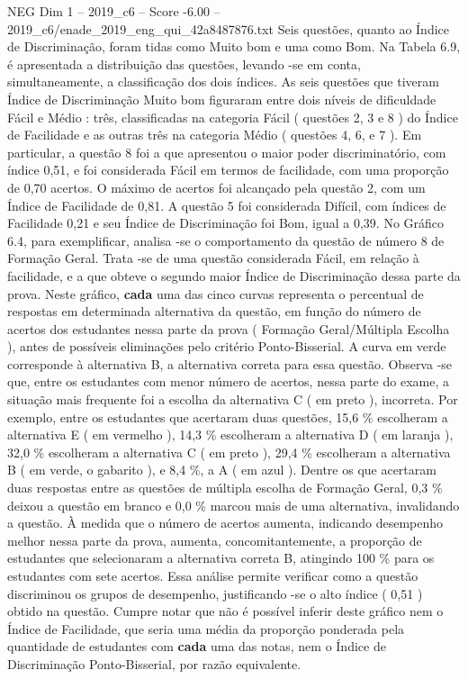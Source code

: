 \begin{textsample}{NEG Dim 1 – 2019\_c6 – Score -6.00 – 2019\_c6/enade\_2019\_eng\_qui\_42a8487876.txt}
Seis questões, quanto ao Índice de Discriminação, foram tidas como Muito bom e uma como Bom.
Na Tabela 6.9, é apresentada a distribuição das questões, levando -se em conta, simultaneamente, a classificação dos dois índices.
As seis questões que tiveram Índice de Discriminação Muito bom figuraram entre dois níveis de dificuldade Fácil e Médio : três, classificadas na categoria Fácil ( questões 2, 3 e 8 ) do Índice de Facilidade e as outras três na categoria Médio ( questões 4, 6, e 7 ).
Em particular, a questão 8 foi a que apresentou o maior poder discriminatório, com índice 0,51, e foi considerada Fácil em termos de facilidade, com uma proporção de 0,70 acertos.
O máximo de acertos foi alcançado pela questão 2, com um Índice de Facilidade de 0,81.
A questão 5 foi considerada Difícil, com índices de Facilidade 0,21 e seu Índice de Discriminação foi Bom, igual a 0,39.
No Gráfico 6.4, para exemplificar, analisa -se o comportamento da questão de número 8 de Formação Geral.
Trata -se de uma questão considerada Fácil, em relação à facilidade, e a que obteve o segundo maior Índice de Discriminação dessa parte da prova.
Neste gráfico, \textbf{cada} uma das cinco curvas representa o percentual de respostas em determinada alternativa da questão, em função do número de acertos dos estudantes nessa parte da prova ( Formação Geral/Múltipla Escolha ), antes de possíveis eliminações pelo critério Ponto-Bisserial.
A curva em verde corresponde à alternativa B, a alternativa correta para essa questão.
Observa -se que, entre os estudantes com menor número de acertos, nessa parte do exame, a situação mais frequente foi a escolha da alternativa C ( em preto ), incorreta.
Por exemplo, entre os estudantes que acertaram duas questões, 15,6 \% escolheram a alternativa E ( em vermelho ), 14,3 \% escolheram a alternativa D ( em laranja ), 32,0 \% escolheram a alternativa C ( em preto ), 29,4 \% escolheram a alternativa B ( em verde, o gabarito ), e 8,4 \%, a A ( em azul ).
Dentre os que acertaram duas respostas entre as questões de múltipla escolha de Formação Geral, 0,3 \% deixou a questão em branco e 0,0 \% marcou mais de uma alternativa, invalidando a questão.
À medida que o número de acertos aumenta, indicando desempenho melhor nessa parte da prova, aumenta, concomitantemente, a proporção de estudantes que selecionaram a alternativa correta B, atingindo 100 \% para os estudantes com sete acertos.
Essa análise permite verificar como a questão discriminou os grupos de desempenho, justificando -se o alto índice ( 0,51 ) obtido na questão.
Cumpre notar que não é possível inferir deste gráfico nem o Índice de Facilidade, que seria uma média da proporção ponderada pela quantidade de estudantes com \textbf{cada} uma das notas, nem o Índice de Discriminação Ponto-Bisserial, por razão equivalente.

\end{textsample}
